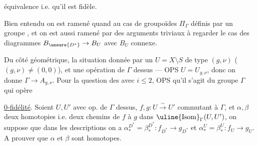 
équivalence  i.e. qu'il est  fidèle.

Bien entendu on est ramené quand  au cas de groupoïdes  \(\Pi_\Gamma\) définis par un groupe , et on est aussi ramené par des arguments  triviaux à regarder le cas des diagrammes \(B_{\unsure{D^*}}\to B_U\) avec \(B_U\) connexe.

Du côté géométrique, la situation  donnée par un \(U=X\setminus S\) de type \((g,\nu)\) (\((g,\nu)\ne(0,0)\)), et une opération de \(\Gamma\) dessus --- OPS \(U=U_{g,\nu}\), donc on donne \(\Gamma\to A_{g,\nu}\). Pour la question des  avec \(i\leq 2\), OPS qu'il s'agit du  groupe \(\Gamma\) qui opère\unsure{;} 

 \uline{0-fidélité}.  Soient \(U,U'\) avec op. de \(\Gamma\) dessus, \(f,g:U\stackrel{\sim}{\longrightarrow}U'\) commutant à \(\Gamma\), et \(\alpha,\beta\) deux homotopies  i.e. deux chemins de \(f\) à \(g\) dans \(\uline{\mathrm{Isom}}_\Gamma(U,U')\), on suppose que dans les descriptions 
on a \(\alpha_*^{D^*}=\beta_*^{D^*}:f_{D^*}\to g_{D^*}\) et \(\alpha_*^U=\beta_*^U:f_U\to g_U\). A prouver que \(\alpha\) et \(\beta\) sont homotopes.



